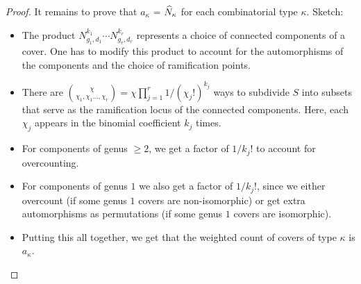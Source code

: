 \begin{proof}
 It remains to prove that $a_\kappa$ = $\widehat{N}_\kappa$ for each combinatorial type $\kappa$. Sketch:
 \begin{itemize}
  \item The product $N_{g_1,d_1}^{k_1}\dotsm N_{g_r,d_r}^{k_r}$ represents a choice of connected components of a cover. One has to modify this product to account for the automorphisms of the components and the choice of ramification points.
  \item There are $\binom{\chi}{\chi_1,\chi_1\dotsc,\chi_r}=\chi\prod_{j=1}^r 1/(\chi_j!)^{k_j}$ ways to subdivide $S$ into subsets that serve as the ramification locus of the connected components. Here, each $\chi_j$ appears in the binomial coefficient $k_j$ times.
  \item For components of genus $\geq 2$, we get a factor of $1/k_j!$ to account for overcounting.
  \item For components of genus $1$ we also get a factor of $1/k_j!$, since we either overcount (if some genus $1$ covers are non-isomorphic) or get extra automorphisms as permutations (if some genus $1$ covers are isomorphic).
  \item Putting this all together, we get that the weighted count of covers of type $\kappa$ is $a_\kappa$.
 \end{itemize}
\end{proof}